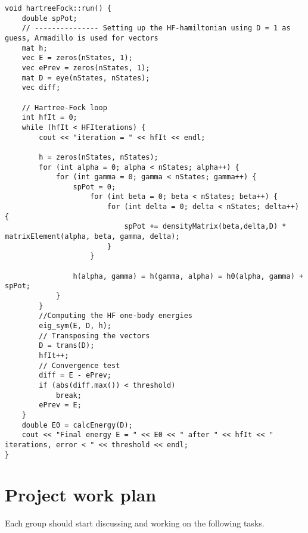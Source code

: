 \documentclass[letterpaper,12pt]{article}
\begin{document}
\begin{lstlisting}
void hartreeFock::run() {
    double spPot;
    // --------------- Setting up the HF-hamiltonian using D = 1 as guess, Armadillo is used for vectors
    mat h;
    vec E = zeros(nStates, 1);
    vec ePrev = zeros(nStates, 1);
    mat D = eye(nStates, nStates);
    vec diff;

    // Hartree-Fock loop
    int hfIt = 0;
    while (hfIt < HFIterations) {
        cout << "iteration = " << hfIt << endl;

        h = zeros(nStates, nStates);
        for (int alpha = 0; alpha < nStates; alpha++) {
            for (int gamma = 0; gamma < nStates; gamma++) {
                spPot = 0;
                    for (int beta = 0; beta < nStates; beta++) {
                        for (int delta = 0; delta < nStates; delta++) {
                            spPot += densityMatrix(beta,delta,D) * matrixElement(alpha, beta, gamma, delta);
                        }
                    }
                
                h(alpha, gamma) = h(gamma, alpha) = h0(alpha, gamma) + spPot;
            }
        }
        //Computing the HF one-body energies
        eig_sym(E, D, h);
        // Transposing the vectors
        D = trans(D);
        hfIt++;
        // Convergence test
        diff = E - ePrev;
        if (abs(diff.max()) < threshold)
            break;
        ePrev = E;
    }
    double E0 = calcEnergy(D);
    cout << "Final energy E = " << E0 << " after " << hfIt << " iterations, error < " << threshold << endl;
}
\end{lstlisting}


\section{Project work plan}

Each group should start discussing and working on the following tasks.

\end{document}
